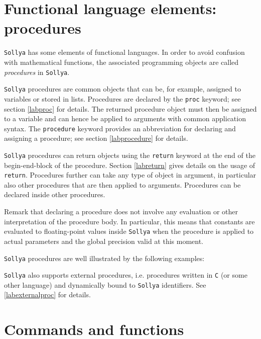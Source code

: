 \documentclass[a4paper]{article}
\newcommand{\key}[1]{\texttt{#1}}
\newcommand{\sollya}{\texttt{Sollya}\xspace}
\begin{document}


\section{Functional language elements: procedures}

\sollya has some elements of functional languages. In order to 
avoid confusion with mathematical functions, the associated 
programming objects are called \emph{procedures} in \sollya. 

\sollya procedures are common objects that can be, for example,
assigned to variables or stored in lists. Procedures are declared by
the \key{proc} keyword; see section \ref{labproc} for details. The
returned procedure object must then be assigned to a variable and can
hence be applied to arguments with common application syntax. The
\key{procedure} keyword provides an abbreviation for declaring and
assigning a procedure; see section \ref{labprocedure} for details.

\sollya procedures can return objects using the \key{return} keyword
at the end of the begin-end-block of the procedure. Section
\ref{labreturn} gives details on the usage of \key{return}. Procedures
further can take any type of object in argument, in particular also
other procedures that are then applied to arguments. Procedures can
be declared inside other procedures. 

Remark that declaring a procedure does not involve any evaluation or
other interpretation of the procedure body. In particular, this means
that constants are evaluated to floating-point values inside \sollya
when the procedure is applied to actual parameters and the global
precision valid at this moment.

\sollya procedures are well illustrated by the following examples:



\sollya also supports external procedures, i.e. procedures written in
\texttt{C} (or some other language) and dynamically bound to \sollya
identifiers. See \ref{labexternalproc} for details.

\section{Commands and functions}


\end{document}
